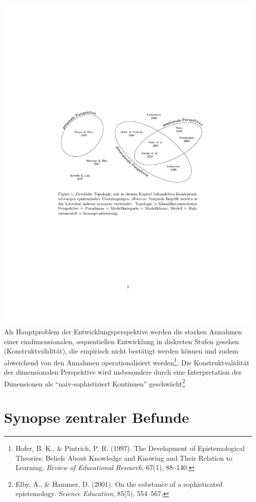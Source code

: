 \documentclass[]{tufte-handout}
\begin{document}
\includegraphics{../Img/Topologie.pdf} Als Hauptproblem der
Entwicklungsperspektive werden die starken Annahmen einer
eindimensionalen, sequentiellen Entwicklung in diskreten Stufen gesehen
(Konstruktvalidität), die empirisch nicht bestätigt werden können und
zudem abweichend von den Annahmen operationalisiert werden\footnote{Hofer,
  B. K., \& Pintrich, P. R. (1997). The Development of Epistemological
  Theories: Beliefs About Knowledge and Knowing and Their Relation to
  Learning. \emph{Review of Educational Research}, 67(1), 88--140.}. Die
Konstruktvalidität der dimensionalen Perspektive wird insbesondere durch
eine Interpretation der Dimensionen als ``naiv-sophistiziert Kontinuen''
geschwächt\footnote{Elby, A., \& Hammer, D. (2001). On the substance of
  a sophisticated epistemology. \emph{Science Education}, 85(5),
  554--567.}
\pagebreak
\section{Synopse zentraler Befunde}\label{synopse-zentraler-befunde}
\end{document}
